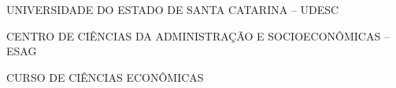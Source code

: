 

\renewcommand{\imprimircapa}{%
	\begin{capa}%
		\center

		{\fontseries{b}\selectfont\MakeTextUppercase{UNIVERSIDADE DO ESTADO DE SANTA CATARINA -- UDESC}}

		{\fontseries{b}\selectfont\MakeTextUppercase{CENTRO DE CIÊNCIAS DA ADMINISTRAÇÃO E SOCIOECONÔMICAS -- ESAG}}

		{\fontseries{b}\selectfont\MakeTextUppercase{CURSO DE CIÊNCIAS ECONÔMICAS}}

		\vfill

		{\fontseries{b}\selectfont\MakeTextUppercase{\normalsize\imprimirautor}}

		\vfill
		\begin{center}
			{\fontseries{b}\selectfont\MakeTextUppercase{\imprimirtitulo}}
		\end{center}
		\vfill

		\vfill

		{\fontseries{b}\selectfont\MakeTextUppercase{\imprimirlocal}}
		\par
		{\selectfont \imprimirdata}
		\vspace*{1cm}
	\end{capa}
}



\imprimircapa				%

